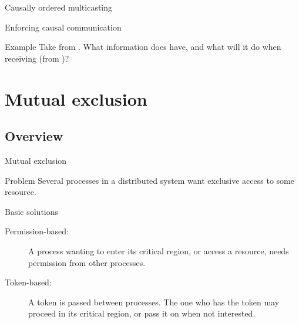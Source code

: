   \begin{slide}{Causally ordered multicasting}
    \begin{block}{Enforcing causal communication}
      \begin{centerfig}
      \end{centerfig}
    \end{block}
    \begin{exampleblock}{Example}
      Take  from . What information does 
      have, and what will it do when receiving  (from )?
    \end{exampleblock}
  \end{slide}
\section{Mutual exclusion}
\subsection{Overview}
\begin{slide}{Mutual exclusion}
  \begin{alertblock}{Problem}
    Several processes in a distributed system want exclusive access to some resource.
  \end{alertblock}
  \begin{block}{Basic solutions}
    \begin{description}
      \item[Permission-based:] A process wanting to enter its critical region, or access a resource, needs
        permission from other processes.
      \item[Token-based:] A token is passed between processes. The one who has the token may proceed in its
        critical region, or pass it on when not interested.
    \end{description}
  \end{block}
\end{slide}
